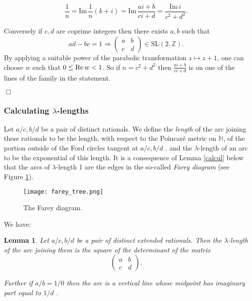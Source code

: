 \documentclass[12pt,a4paper]{amsart}
\newtheorem{lem}[thm]{Lemma}
\def\HH{\mathbb{H}}
\def\im{\mathrm{Im}\,}
\def\ZZ{\mathbb{Z}}
\def\sl2{\mathrm{SL}(2, \ZZ)}
\begin{document}
$$\frac{1}{n} = \im \frac{1 }{n}(k + i)  
= \im  \frac{ai +b}{ci+d }
= \frac{\im i} {c^2 + d^2}.$$

Conversely if $c,d$ are coprime integers 
 then there exists $a,b$ such that
 $$ad - bc = 1 \Rightarrow  
 \begin{pmatrix}
 a & b \\
 c & d
 \end{pmatrix} \in \sl2.
$$
By applying a suitable power of the parabolic transformation 
$z \mapsto z + 1$,
one can choose $w$ such that $0 \leq \text{Re\,} w < 1$.
So if $n = c^2 + d^2$ then $\frac{ai +b}{ci+d }$
is on one of the lines of the family in the statement.

\hfill $\Box$

\subsubsection{Calculating $\lambda$-lengths}

Let $a/c, b/d$ be a pair of distinct rationals. We define the \textit{length}
of the arc joining these rationals to be the length, with respect to the
Poincar\'e metric on $\HH$, of the portion  outside of the Ford circles tangent
at $a/c, b/d$ . and the $\lambda$-length of an arc to be the exponential of
this length. It is a consequence  of Lemma \ref{calcul} below  that the arcs of
$\lambda$-length 1 are the edges in the so-called \textit{Farey diagram} 
 (see Figure \ref{fig: farey diagram}). 

\begin{figure}[ht]
\begin{center}
\texttt{[image: farey\_tree.png]}
\end{center}
\caption{The Farey diagram.}
	\label{fig: farey diagram}
\end{figure}

We have:

\begin{lem}\label{determinant}
Let $a/c, b/d$ be a pair of distinct extended rationals.
Then the  $\lambda$-length of the arc joining them
 is the square of the determinant of the matrix
$$\begin{pmatrix}
a & b \\ c & d
\end{pmatrix}.$$

Further if $a/b = 1/0$ then the arc is a vertical line 
 whose midpoint has imaginary part equal to $1/d$ .
\end{lem}
\end{document}
